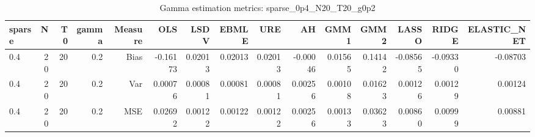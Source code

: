 \begin{table}[!htbp]\centering
\caption{Gamma estimation metrics: sparse_0p4_N20_T20_g0p2}
\label{tab:table1_sparse_0p4_N20_T20_g0p2}
\begin{tabular}{lrrrrrrrrrrrrrr}
\hline
sparse & N & T0 & gamma & Measure & OLS & LSDV & EBMLE & URE & AH & GMM1 & GMM2 & LASSO & RIDGE & ELASTIC_NET \\
\hline
0.4 & 20 & 20 & 0.2 & Bias & -0.16173 & 0.02013 & 0.02013 & 0.02013 & -0.00046 & 0.01565 & 0.14142 & -0.08565 & -0.09330 & -0.08703 \\
0.4 & 20 & 20 & 0.2 & Var & 0.00076 & 0.00081 & 0.00081 & 0.00081 & 0.00256 & 0.00108 & 0.01623 & 0.00126 & 0.00129 & 0.00124 \\
0.4 & 20 & 20 & 0.2 & MSE & 0.02692 & 0.00122 & 0.00122 & 0.00122 & 0.00256 & 0.00133 & 0.03623 & 0.00860 & 0.00999 & 0.00881 \\
\hline
\end{tabular}
\end{table}

